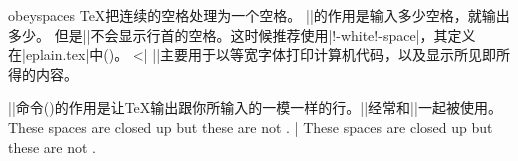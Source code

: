 \enddesc
%
%

\begindesc
\cts obeyspaces {}
\explain
\TeX{}把连续的空格处理为一个空格。
|\obeyspaces|的作用是输入多少空格，就输出多少。
但是|\obeyspaces|不会显示行首的空格。这时候推荐使用|\obey!-white!-space|，其定义在|eplain.tex|中()。
^^|\obeywhitespace|
|\obeyspaces|主要用于以等宽字体打印计算机代码，以及显示所见即所得的内容。


|\obeylines|命令(\xref{\obeylines})的作用是让\TeX{}输出跟你所输入的一模一样的行。|\obeylines|经常和|\obeyspaces|一起被使用。
\example 
These     spaces    are    closed   up
{\obeyspaces but   these  are     not   }.
|
\produces
These     spaces    are    closed   up
{\obeyspaces but   these  are     not   }.
\endexample
\enddesc




